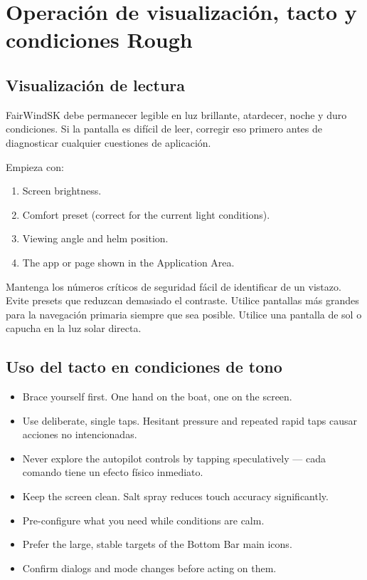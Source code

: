 \chapter{Operación de visualización, tacto y condiciones Rough}
\label{ch:roughconditions}

\section{Visualización de lectura}

FairWindSK debe permanecer legible en luz brillante, atardecer, noche y duro
condiciones.
Si la pantalla es difícil de leer, corregir eso primero antes de diagnosticar cualquier
cuestiones de aplicación.

Empieza con:
\begin{enumerate}
  \item Screen brightness.
  \item Comfort preset (correct for the current light conditions).
  \item Viewing angle and helm position.
  \item The app or page shown in the Application Area.
\end{enumerate}

Mantenga los números críticos de seguridad fácil de identificar de un vistazo.
Evite presets que reduzcan demasiado el contraste.
Utilice pantallas más grandes para la navegación primaria siempre que sea posible.
Utilice una pantalla de sol o capucha en la luz solar directa.

\section{Uso del tacto en condiciones de tono}

\begin{itemize}
  \item Brace yourself first. One hand on the boat, one on the screen.
  \item Use deliberate, single taps. Hesitant pressure and repeated rapid taps
causar acciones no intencionadas.
  \item Never explore the autopilot controls by tapping speculatively ---
cada comando tiene un efecto físico inmediato.
  \item Keep the screen clean. Salt spray reduces touch accuracy significantly.
  \item Pre-configure what you need while conditions are calm.
  \item Prefer the large, stable targets of the Bottom Bar main icons.
  \item Confirm dialogs and mode changes before acting on them.
\end{itemize}

